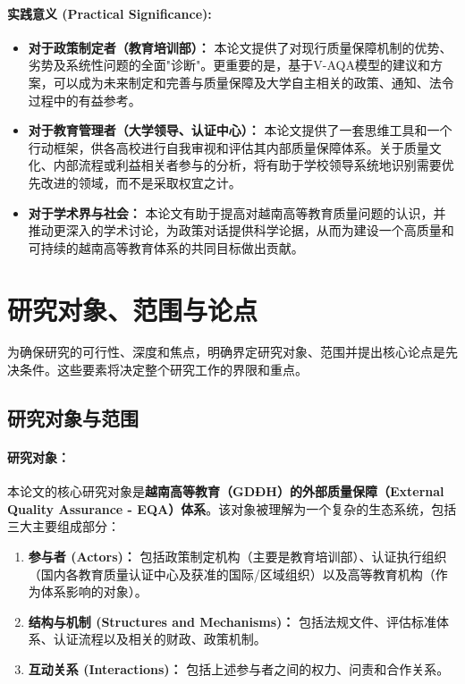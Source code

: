 \paragraph{实践意义 (Practical Significance):}
\begin{itemize}
    \item \textbf{对于政策制定者（教育培训部）：} 本论文提供了对现行质量保障机制的优势、劣势及系统性问题的全面"诊断"。更重要的是，基于V-AQA模型的建议和方案，可以成为未来制定和完善与质量保障及大学自主相关的政策、通知、法令过程中的有益参考。
    \item \textbf{对于教育管理者（大学领导、认证中心）：} 本论文提供了一套思维工具和一个行动框架，供各高校进行自我审视和评估其内部质量保障体系。关于质量文化、内部流程或利益相关者参与的分析，将有助于学校领导系统地识别需要优先改进的领域，而不是采取权宜之计。
    \item \textbf{对于学术界与社会：} 本论文有助于提高对越南高等教育质量问题的认识，并推动更深入的学术讨论，为政策对话提供科学论据，从而为建设一个高质量和可持续的越南高等教育体系的共同目标做出贡献。
\end{itemize}




\section{研究对象、范围与论点}
\label{sec:doi_tuong_pham_vi_luandiem}

为确保研究的可行性、深度和焦点，明确界定研究对象、范围并提出核心论点是先决条件。这些要素将决定整个研究工作的界限和重点。

\subsection{研究对象与范围}
\label{subsec:doi_tuong_pham_vi}

\paragraph{研究对象：}
本论文的核心研究对象是\textbf{越南高等教育（GDĐH）的外部质量保障（External Quality Assurance - EQA）体系}。该对象被理解为一个复杂的生态系统，包括三大主要组成部分：
\begin{enumerate}
    \item \textbf{参与者 (Actors)：} 包括政策制定机构（主要是教育培训部）、认证执行组织（国内各教育质量认证中心及获准的国际/区域组织）以及高等教育机构（作为体系影响的对象）。
    \item \textbf{结构与机制 (Structures and Mechanisms)：} 包括法规文件、评估标准体系、认证流程以及相关的财政、政策机制。
    \item \textbf{互动关系 (Interactions)：} 包括上述参与者之间的权力、问责和合作关系。
\end{enumerate}

